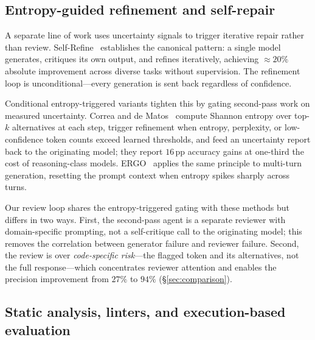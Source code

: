 \subsection{Entropy-guided refinement and self-repair}
\label{subsec:related-refinement}

A separate line of work uses uncertainty signals to trigger iterative
repair rather than review. Self-Refine~\cite{madaan2023selfrefine}
establishes the canonical pattern: a single model generates, critiques
its own output, and refines iteratively, achieving $\approx 20\%$
absolute improvement across diverse tasks without supervision. The
refinement loop is unconditional---every generation is sent back
regardless of confidence.

Conditional entropy-triggered variants tighten this by gating
second-pass work on measured uncertainty. Correa and de
Matos~\cite{correa2025entropyloop} compute Shannon entropy over top-$k$
alternatives at each step, trigger refinement when entropy, perplexity,
or low-confidence token counts exceed learned thresholds, and feed an
uncertainty report back to the originating model; they report
$16$\,pp accuracy gains at one-third the cost of reasoning-class
models. ERGO~\cite{khalid2025ergo} applies the same principle to
multi-turn generation, resetting the prompt context when entropy
spikes sharply across turns.

Our review loop shares the entropy-triggered gating with these methods
but differs in two ways. First, the second-pass agent is a separate
reviewer with domain-specific prompting, not a self-critique call to
the originating model; this removes the correlation between generator
failure and reviewer failure. Second, the review is over
\emph{code-specific risk}---the flagged token and its alternatives,
not the full response---which concentrates reviewer attention and
enables the precision improvement from $27\%$ to $94\%$
(\S\ref{sec:comparison}).

\subsection{Static analysis, linters, and execution-based evaluation}
\label{subsec:related-static}


